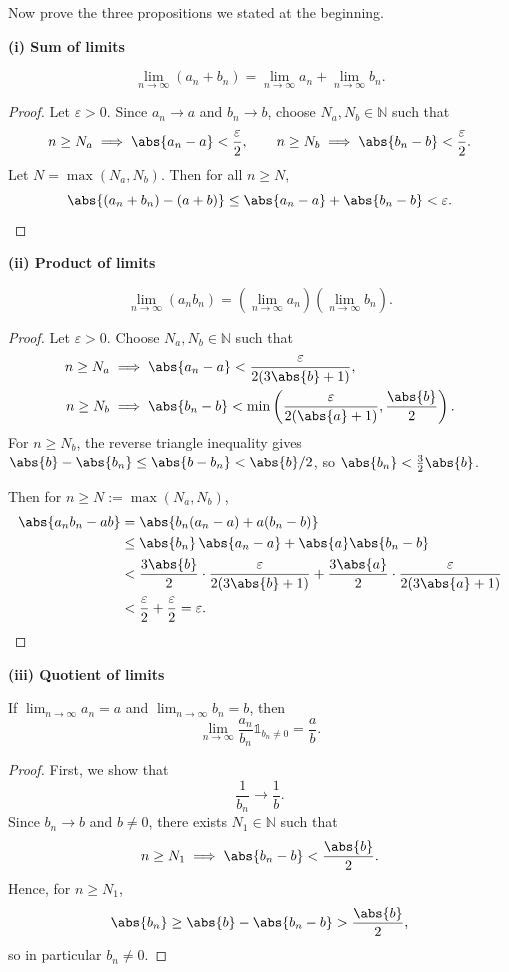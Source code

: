 \begin{exc}
    \begin{exercise}
	Now prove the three propositions we stated at the beginning.
	\label{exc:limit_properties}
    \end{exercise}
   	\begin{solution}
		\textbf{(i) Sum of limits}
		\begin{claim}
			\[\lim_{n\to\infty}(a_n+b_n) = \lim_{n\to\infty} a_n + \lim_{n\to\infty} b_n.\]
		\end{claim}
		\begin{proof}
			Let $\varepsilon > 0$. Since $a_n \to a$ and $b_n \to b$, choose $N_a, N_b \in \mathbb{N}$ such that
			\[
				n \geq N_a \implies \abs{a_n - a} < \frac{\varepsilon}{2}, \qquad
				n \geq N_b \implies \abs{b_n - b} < \frac{\varepsilon}{2}.
			\]
			Let $N = \max(N_a, N_b)$. Then for all $n \geq N$,
			\[
				\abs{(a_n+b_n) - (a+b)} \leq \abs{a_n - a} + \abs{b_n - b} < \varepsilon.
			\]
		\end{proof}
		\textbf{(ii) Product of limits}
		\begin{claim}
			\[\lim_{n\to\infty} (a_n b_n) = (\lim_{n\to\infty} a_n)(\lim_{n\to\infty} b_n).\]
		\end{claim}
		\begin{proof}
			Let $\varepsilon > 0$. Choose $N_a, N_b \in \mathbb{N}$ such that
			\begin{align*}
				n \geq N_a &\implies \abs{a_n - a} < \frac{\varepsilon}{2(3\abs{b}+1)}, \\
				n \geq N_b &\implies \abs{b_n - b} < \min\left(\frac{\varepsilon}{2(\abs{a}+1)}, \frac{\abs{b}}{2}\right).
			\end{align*}
			For $n \geq N_b$, the reverse triangle inequality gives $\abs{b} - \abs{b_n} \leq \abs{b - b_n} < \abs{b}/2$, so $\abs{b_n} < \tfrac{3}{2}\abs{b}$.

			Then for $n \geq N := \max(N_a, N_b)$,
			\begin{align*}
				\abs{a_nb_n - ab} &= \abs{b_n(a_n-a) + a(b_n-b)} \\
				&\leq \abs{b_n}\,\abs{a_n - a} + \abs{a}\abs{b_n - b} \\
				&< \frac{3\abs{b}}{2}\cdot\frac{\varepsilon}{2(3\abs{b}+1)} + \frac{3\abs{a}}{2}\cdot\frac{\varepsilon}{2(3\abs{a}+1)} \\
				&< \frac{\varepsilon}{2} + \frac{\varepsilon}{2} = \varepsilon.
			\end{align*}
		\end{proof}
		\textbf{(iii) Quotient of limits}
		\begin{claim}
			If $\lim_{n\to\infty} a_n = a$ and $\lim_{n\to\infty} b_n = b$, then
			\[
				\lim_{n\to\infty} \frac{a_n}{b_n} \mathbb{1}_{b_n\neq 0} = \frac{a}{b}.
			\]
		\end{claim}
		\begin{proof}
			First, we show that
			\[
				\frac{1}{b_n} \to \frac{1}{b}.
			\]
			Since $b_n \to b$ and $b \neq 0$, there exists $N_1 \in \mathbb{N}$ such that
			\[
				n \geq N_1 \implies \abs{b_n - b} < \frac{\abs{b}}{2}.
			\]
			Hence, for $n \geq N_1$,
			\[
				\abs{b_n} \geq \abs{b} - \abs{b_n - b} > \frac{\abs{b}}{2},
			\]
			so in particular $b_n \neq 0$.


\end{proof}
\end{solution}
\end{exc}

